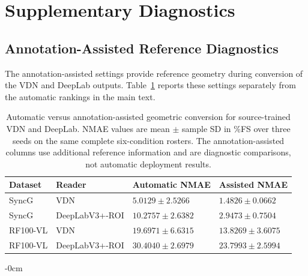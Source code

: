 \documentclass[electronics,article,submit,oneauthor]{Definitions/mdpi}
\begin{document}
\acknowledgments{}



\appendixstart
\appendix
\section{Supplementary Diagnostics}
\label{app:supplementary_diagnostics}

\subsection{Annotation-Assisted Reference Diagnostics}
\label{app:annotation_diagnostic}
\label{app:annotation}

The annotation-assisted settings provide reference geometry during conversion of the VDN and DeepLab outputs. Table~\ref{tab:annotation_diagnostic} reports these settings separately from the automatic rankings in the main text.

\begin{table}[H]
\caption{Automatic versus annotation-assisted geometric conversion for source-trained VDN and DeepLab. NMAE values are mean $\pm$ sample SD in \%FS over three seeds on the same complete six-condition rosters. The annotation-assisted columns use additional reference information and are diagnostic comparisons, not automatic deployment results.}
\label{tab:annotation_diagnostic}
\centering
\small
\begin{tabularx}{\textwidth}{@{}ll>{\centering\arraybackslash}X>{\centering\arraybackslash}X@{}}
\toprule
\textbf{Dataset} & \textbf{Reader} & \textbf{Automatic NMAE} & \textbf{Assisted NMAE} \\
\midrule

SyncG & VDN & $5.0129\pm2.5266$ & $1.4826\pm0.0662$ \\

SyncG & DeepLabV3+-ROI & $10.2757\pm2.6382$ & $2.9473\pm0.7504$ \\

RF100-VL & VDN & $19.6971\pm6.6315$ & $13.8269\pm3.6075$ \\

RF100-VL & DeepLabV3+-ROI & $30.4040\pm2.6979$ & $23.7993\pm2.5994$ \\

\bottomrule
\end{tabularx}
\end{table}

\begin{adjustwidth}{-\extralength}{0cm}

\end{adjustwidth}
\end{document}
